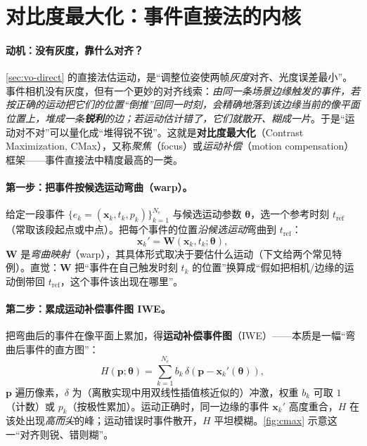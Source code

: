 \section{对比度最大化：事件直接法的内核}
\label{sec:event-cmax}

\paragraph{动机：没有灰度，靠什么对齐？}
\cref{sec:vo-direct} 的直接法估运动，是“调整位姿使两帧\emph{灰度}对齐、光度误差最小”。事件相机没有灰度，但有一个更妙的对齐线索：\emph{由同一条场景边缘触发的事件，若按正确的运动把它们的位置“倒推”回同一时刻，会精确地落到该边缘当前的像平面位置上，堆成一条\textbf{锐利}的边；若运动估计错了，它们就散开、糊成一片}。于是“运动对不对”可以量化成“堆得锐不锐”。这就是\textbf{对比度最大化}（Contrast Maximization, CMax），又称\emph{聚焦}（focus）或\emph{运动补偿}（motion compensation）框架\cite{gallego2018cmax}——事件直接法中精度最高的一类。

\paragraph{第一步：把事件按候选运动弯曲（warp）。}
给定一段事件 $\{e_k=(\mathbf x_k,t_k,p_k)\}_{k=1}^{N_e}$ 与候选运动参数 $\boldsymbol\theta$，选一个参考时刻 $t_{\mathrm{ref}}$（常取该段起点或中点）。把每个事件的位置\emph{沿候选运动}弯曲到 $t_{\mathrm{ref}}$：
\begin{equation}
  \mathbf x_k'=\mathbf W(\mathbf x_k,t_k;\boldsymbol\theta),
  \label{eq:cmax-warp}
\end{equation}
$\mathbf W$ 是\emph{弯曲映射}（warp），其具体形式取决于要估什么运动（下文给两个常见特例）。直觉：$\mathbf W$ 把“事件在自己触发时刻 $t_k$ 的位置”换算成“假如把相机/边缘的运动倒带回 $t_{\mathrm{ref}}$，这个事件该出现在哪里”。

\paragraph{第二步：累成运动补偿事件图 IWE。}
把弯曲后的事件在像平面上累加，得\textbf{运动补偿事件图}（IWE）——本质是一幅“弯曲后事件的直方图”：
\begin{equation}
  H(\mathbf p;\boldsymbol\theta)=\sum_{k=1}^{N_e} b_k\,\delta(\mathbf p-\mathbf x_k'(\boldsymbol\theta)),
  \label{eq:cmax-iwe}
\end{equation}
$\mathbf p$ 遍历像素，$\delta$ 为（离散实现中用双线性插值核近似的）冲激，权重 $b_k$ 可取 $1$（计数）或 $p_k$（按极性累加）。运动正确时，同一边缘的事件 $\mathbf x_k'$ 高度重合，$H$ 在该处出现\emph{高而尖}的峰；运动错误时事件散开，$H$ 平坦模糊。\cref{fig:cmax} 示意这一“对齐则锐、错则糊”。

